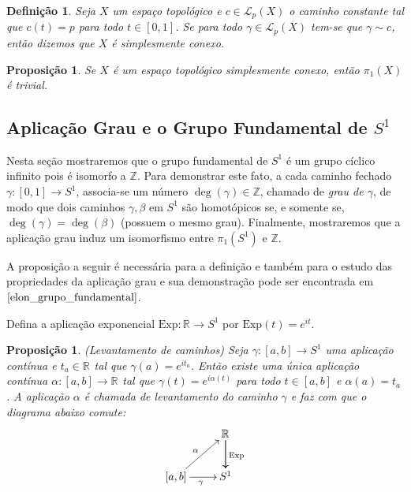 \documentclass[12pt]{book}
\newtheorem{definicao}[teorema]{Definição}
\newtheorem{proposicao}[teorema]{Proposição}
\newcommand{\caminhos}{\mathcal{L}}
\newcommand{\caminhospontobasegeral}[2]{\caminhos_{#1}(#2)}
\newcommand{\circulo}{S^{1}}
\newcommand{\Exp}{\text{Exp}}
\newcommand{\grupofundamental}[1]{\pi_{1}(#1)}
\newcommand{\inteiros}{\mathbb{Z}}
\newcommand{\intervalo}{[0,1]}
\newcommand{\real}[1]{\mathbb{R}^{#1}}
\newcommand{\reta}{\real{}}
\begin{document}
	\begin{definicao}
		Seja $X$ um espaço topológico e
		$c \in \caminhospontobasegeral{p}{X}$ o caminho constante tal que $c(t) = p$ para todo $t \in \intervalo$. Se para todo $\gamma \in \caminhospontobasegeral{p}{X}$ tem-se que $\gamma \sim c$, então dizemos que $X$ é simplesmente conexo.
	\end{definicao}
	
	\begin{proposicao}\label{proposicao_grupo_fundamental_simplesmente_conexo}
		Se $X$ é um espaço topológico simplesmente conexo, então $\grupofundamental{X}$ é trivial.
	\end{proposicao}
	
	\subsection{Aplicação Grau e o Grupo Fundamental de $\circulo$}
	Nesta seção mostraremos que o grupo fundamental de $S^{1}$ é um grupo cíclico infinito pois é isomorfo a $\inteiros$. Para demonstrar este fato, a cada caminho fechado $\gamma:[0,1] \to S^{1}$, associa-se um número $\deg(\gamma) \in \inteiros$, chamado de \textit{grau de $\gamma$}, de modo que dois caminhos $\gamma, \beta$ em $S^{1}$ são homotópicos se, e somente se, $\deg(\gamma) = \deg(\beta)$ (possuem o mesmo grau). Finalmente, mostraremos que a aplicação grau induz um isomorfismo entre $\pi_{1}(S^{1})$ e $\inteiros$.
	
	A proposição a seguir é necessária para a definição e também para o estudo das propriedades da aplicação grau e sua demonstração pode ser encontrada em $\cite{elon_grupo_fundamental}$.
	
	Defina a aplicação exponencial $\Exp: \reta\to \circulo$ por $\Exp(t) = e^{it}$.
	
	\begin{proposicao}\label{proposicao_levantamento_curvas}
		(Levantamento de caminhos) Seja $\gamma:[a,b] \to S^{1}$ uma aplicação contínua e $t_{a}\in \real{}$ tal que $\gamma(a) = e^{it_{a}}$. Então existe uma única aplicação contínua $\alpha:[a,b] \to \real{}$ tal que $\gamma(t) = e^{i\alpha(t)}$ para todo $t\in [a,b]$ e $\alpha(a) = t_{a}$. A aplicação $\alpha$ é chamada de levantamento do caminho $\gamma$ e faz com que o diagrama abaixo comute:
		$$
		\xymatrix{
			& \real{}\ar[d]\ar[d]^{\Exp}
			\\
			[a,b]\ar[ur]^{\alpha} \ar[r]_{\gamma} & S^{1}
		}
		$$
	\end{proposicao}
	
\end{document}
